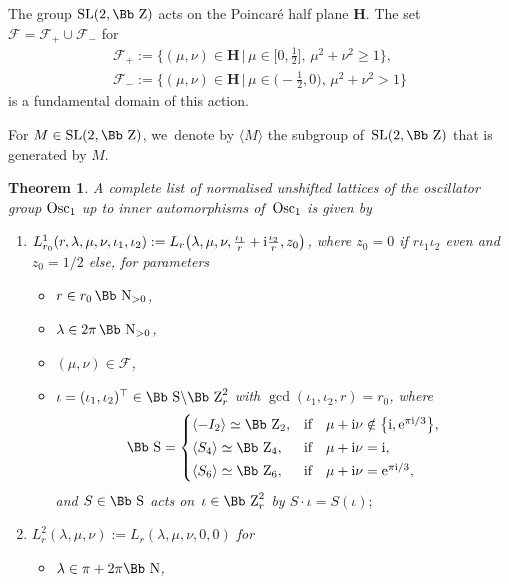 \documentclass[pdftex]{sigma}
\newcommand\NN{{\mbox{\Bb N}}}
\newcommand\ZZ{{\mbox{\Bb Z}}}
\newcommand\SSS{{\mbox{\Bb S}}}
\newcommand\cF{{\mathcal F}}
\newcommand{\SL}{\mathop{{\rm SL}}}
\newcommand{\Osc}{{\rm Osc}}
\newcommand\la{\langle}
\newcommand\ra{\rangle}
\numberwithin{equation}{section}
\newtheorem{Theorem}{Theorem}[section]
\begin{document}
The group $\SL(2,\ZZ)$ acts on the Poincar\'e half plane $\textbf{H}$. The set $\cF=\cF_+\cup\cF_-$ for
 \begin{gather}
\cF_+:= \bigg\{(\mu,\nu)\in\textbf{H}\,\bigg|\,\mu\in\bigg[0,\frac{1}{2}\bigg],\,
\mu^2+\nu^2\geq 1\bigg\},\nonumber
\\
\cF_-:= \bigg\{(\mu,\nu)\in\textbf{H}\,\bigg|\,\mu\in\bigg({-}\frac{1}{2},0\bigg),\,
\mu^2+\nu^2>1\bigg\} \label{F+}
\end{gather}
is a fundamental domain of this action.

For $M\in\SL(2,\ZZ)$, we~denote by $\la M \ra$ the subgroup of~$\SL(2,\ZZ)$ that is generated by $M$.

\begin{Theorem}\label{th:classUptoInner}
A complete list of normalised unshifted lattices of the oscillator group $\Osc_1$ up to inner automorphisms of~$\Osc_1$ is given by
\begin{enumerate}\itemsep=0pt
\item[$1.$] $L^1_{r_0}(r,\lambda,\mu,\nu,\iota_1,\iota_2):= L_r\big(\lambda,\mu,\nu,\frac{\iota_1}{r}+{\rm i}\frac{\iota_2}{r},z_0\big)$, where $z_0=0$ if $r\iota_1\iota_2$ even and $z_0=1/2$ else, for parameters
\begin{itemize}
\item[$\circ$] $r\in r_0\,\NN_{>0}$,
\item[$\circ$] $\lambda\in 2\pi\,\NN_{>0}$,
\item[$\circ$] $(\mu,\nu)\in\cF$,
\item[$\circ$] $\iota=(\iota_1,\iota_2)^\top\in\SSS\backslash\ZZ^2_r$ with $\gcd(\iota_1,\iota_2,r)=r_0$, where
\begin{gather*}
\SSS=\begin{cases}
\langle-I_2\rangle\simeq \ZZ_2, & \text{if}\quad \mu+{\rm i}\nu\notin\big\{{\rm i},{\rm e}^{\pi {\rm i}/3}\big\},
\\[0.5ex]
\langle S_4\rangle\simeq \ZZ_4, & \text{if}\quad \mu+{\rm i}\nu={\rm i},
\\[0.5ex]
\langle S_6\rangle\simeq \ZZ_6, & \text{if}\quad \mu+{\rm i}\nu={\rm e}^{\pi {\rm i}/3},
\end{cases}
\end{gather*}
and $S\in\SSS$ acts on~$\iota\in\ZZ^2_r$
by
$S\cdot\iota=S(\iota);$
\end{itemize}
%
\item[$2.$] $L^2_r(\lambda,\mu,\nu):=L_r(\lambda,\mu,\nu,0,0)$ for
\begin{itemize}
\item[$\circ$] $\lambda\in\pi+2\pi\NN$,

\end{itemize}
\end{enumerate}
\end{Theorem}
\end{document}
